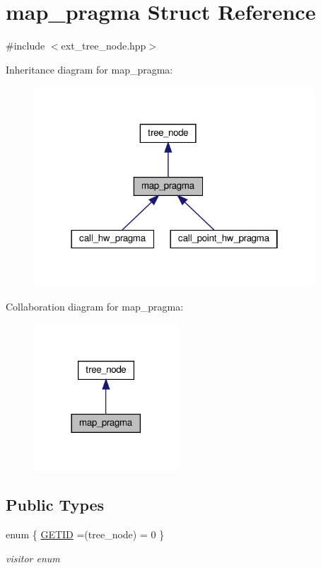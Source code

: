 \hypertarget{structmap__pragma}{}\section{map\+\_\+pragma Struct Reference}
\label{structmap__pragma}


{\ttfamily \#include $<$ext\+\_\+tree\+\_\+node.\+hpp$>$}



Inheritance diagram for map\+\_\+pragma\+:
\nopagebreak
\begin{figure}[H]
\begin{center}
\leavevmode
\includegraphics[width=298pt]{d3/dcf/structmap__pragma__inherit__graph}
\end{center}
\end{figure}


Collaboration diagram for map\+\_\+pragma\+:
\nopagebreak
\begin{figure}[H]
\begin{center}
\leavevmode
\includegraphics[width=153pt]{df/d70/structmap__pragma__coll__graph}
\end{center}
\end{figure}
\subsection*{Public Types}
\begin{DoxyCompactItemize}
\item 
enum \{ \hyperlink{structmap__pragma_a98dab333f6246766d781ca919ba58d7aae34e8ec97a6c21f5d2db40350d239a67}{G\+E\+T\+ID} =(tree\+\_\+node) = 0
 \}\begin{DoxyCompactList}\small\item\em visitor enum \end{DoxyCompactList}
\end{DoxyCompactItemize}
